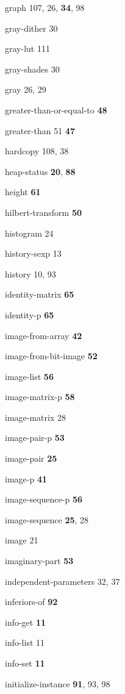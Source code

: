 \begin{theindex}
\item {\ptt graph} 107, 26, {\bf 34}, 98
\item {\ptt gray-dither} 30
\item {\ptt gray-lut} 111
\item {\ptt gray-shades} 30
\item {\ptt gray} 26, 29
\item {\ptt greater-than-or-equal-to}
 {\bf 48}
\item {\ptt greater-than} 51
 {\bf 47}
\item {\ptt hardcopy} 108, 38
\item {\ptt heap-status} {\bf 20}, {\bf 88}
\item {\ptt height}
 {\bf 61}
\item {\ptt hilbert-transform} {\bf 50}
\item {\ptt histogram} 24
\item {\ptt history-sexp} 13
\item {\ptt history} 10, 93
\item {\ptt identity-matrix} {\bf 65}
\item {\ptt identity-p} {\bf 65}
\item {\ptt image-from-array} {\bf 42}
\item {\ptt image-from-bit-image} {\bf 52}
\item {\ptt image-list}
 {\bf 56}
\item {\ptt image-matrix-p} {\bf 58}
\item {\ptt image-matrix} 28
\item {\ptt image-pair-p} {\bf 53}
\item {\ptt image-pair} {\bf 25}
\item {\ptt image-p} {\bf 41}
\item {\ptt image-sequence-p} {\bf 56}
\item {\ptt image-sequence} {\bf 25}, 28
\item {\ptt image} 21
\item {\ptt imaginary-part} {\bf 53}
\item {\ptt independent-parameters} 32, 37
\item {\ptt inferiors-of} {\bf 92}
\item {\ptt info-get} {\bf 11}
\item {\ptt info-list} 11
\item {\ptt info-set} {\bf 11}
\item {\ptt initialize-instance} {\bf 91}, 93, 98

\end{theindex}
